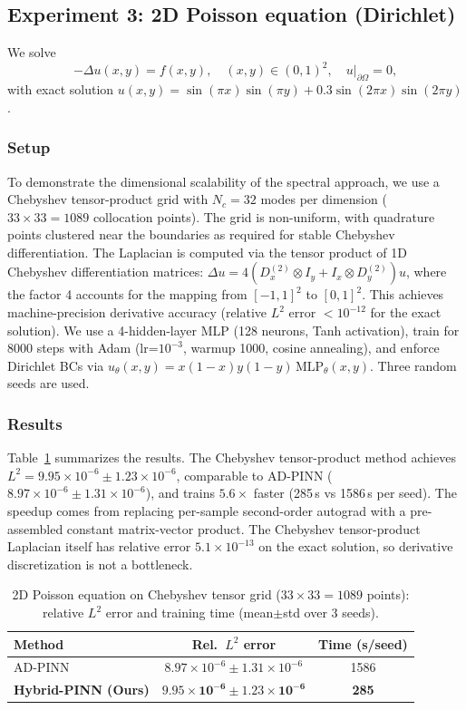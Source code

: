 \documentclass[sn-mathphys,Numbered]{sn-jnl}
\theoremstyle{thmstyleone}
\theoremstyle{thmstyletwo}
\theoremstyle{thmstylethree}
\begin{document}
\subsection{Experiment 3: 2D Poisson equation (Dirichlet)}\label{subsec:exp3}
We solve
\begin{equation}
    -\Delta u(x,y) = f(x,y), \quad (x,y) \in (0,1)^2, \quad u|_{\partial\Omega} = 0,
\end{equation}
with exact solution $u(x,y) = \sin(\pi x)\sin(\pi y) + 0.3\sin(2\pi x)\sin(2\pi y)$.

\subsubsection{Setup}
To demonstrate the dimensional scalability of the spectral approach, we use a Chebyshev tensor-product grid with $N_c=32$ modes per dimension ($33\times33=1089$ collocation points). The grid is non-uniform, with quadrature points clustered near the boundaries as required for stable Chebyshev differentiation. The Laplacian is computed via the tensor product of 1D Chebyshev differentiation matrices: $\Delta u = 4(D_x^{(2)}\otimes I_y + I_x\otimes D_y^{(2)})u$, where the factor 4 accounts for the mapping from $[-1,1]^2$ to $[0,1]^2$. This achieves machine-precision derivative accuracy (relative $L^2$ error $<10^{-12}$ for the exact solution). We use a 4-hidden-layer MLP (128 neurons, Tanh activation), train for 8000 steps with Adam (lr=$10^{-3}$, warmup 1000, cosine annealing), and enforce Dirichlet BCs via $u_\theta(x,y) = x(1-x)y(1-y)\,\mathrm{MLP}_\theta(x,y)$. Three random seeds are used.

\subsubsection{Results}
Table~\ref{tab:poisson2d} summarizes the results. The Chebyshev tensor-product method achieves $L^2 = 9.95\times10^{-6} \pm 1.23\times10^{-6}$, comparable to AD-PINN ($8.97\times10^{-6} \pm 1.31\times10^{-6}$), and trains $5.6\times$ faster (285\,s vs 1586\,s per seed). The speedup comes from replacing per-sample second-order autograd with a pre-assembled constant matrix-vector product. The Chebyshev tensor-product Laplacian itself has relative error $5.1\times10^{-13}$ on the exact solution, so derivative discretization is not a bottleneck.

\begin{table}[t]
\centering
\caption{2D Poisson equation on Chebyshev tensor grid ($33\times33=1089$ points): relative $L^2$ error and training time (mean$\pm$std over 3 seeds).}
\label{tab:poisson2d}
\begin{tabular}{lcc}
\toprule
Method & Rel.\ $L^2$ error & Time (s/seed) \\
\midrule
AD-PINN & $8.97\times10^{-6} \pm 1.31\times10^{-6}$ & 1586 \\
\textbf{Hybrid-PINN (Ours)} & $\mathbf{9.95\times10^{-6} \pm 1.23\times10^{-6}}$ & \textbf{285} \\
\bottomrule
\end{tabular}
\end{table}
\end{document}
